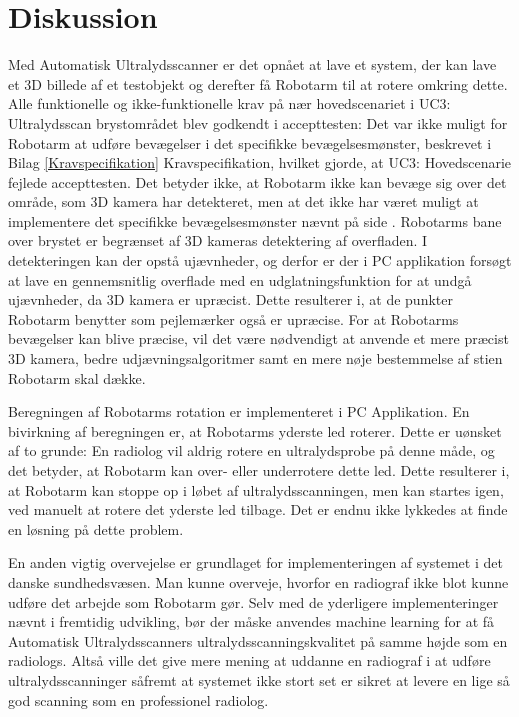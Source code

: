 \chapter{Diskussion}\label{kapitel_Diskussion}
Med Automatisk Ultralydsscanner er det opnået at lave et system, der kan lave et 3D billede af et testobjekt og derefter få Robotarm til at rotere omkring dette. Alle funktionelle og ikke-funktionelle krav på nær hovedscenariet i UC3: Ultralydsscan brystområdet blev godkendt i accepttesten: \newline
Det var ikke muligt for Robotarm at udføre bevægelser i det specifikke bevægelsesmønster, beskrevet i Bilag \ref{Kravspecifikation} Kravspecifikation, hvilket gjorde, at UC3: Hovedscenarie fejlede accepttesten. Det betyder ikke, at Robotarm ikke kan bevæge sig over det område, som 3D kamera har detekteret, men at det ikke har været muligt at implementere det specifikke bevægelsesmønster nævnt på side \pageref{Probensbevagelse}. Robotarms bane over brystet er begrænset af 3D kameras detektering af overfladen. I detekteringen kan der opstå ujævnheder, og derfor er der i PC applikation forsøgt at lave en gennemsnitlig overflade med en udglatningsfunktion for at undgå ujævnheder, da 3D kamera er upræcist. Dette resulterer i, at de punkter Robotarm benytter som pejlemærker også er upræcise. For at Robotarms bevægelser kan blive præcise, vil det være nødvendigt at anvende et mere præcist 3D kamera, bedre udjævningsalgoritmer samt en mere nøje bestemmelse af stien Robotarm skal dække.

Beregningen af Robotarms rotation er implementeret i PC Applikation. En bivirkning af beregningen er, at Robotarms yderste led roterer. Dette er uønsket af to grunde: En radiolog vil aldrig rotere en ultralydsprobe på denne måde, og det betyder, at Robotarm kan over- eller underrotere dette led. Dette resulterer i, at Robotarm kan stoppe op i løbet af ultralydsscanningen, men kan startes igen, ved manuelt at rotere det yderste led tilbage. Det er endnu ikke lykkedes at finde en løsning på dette problem.

En anden vigtig overvejelse er grundlaget for implementeringen af systemet i det danske sundhedsvæsen. Man kunne overveje, hvorfor en radiograf ikke blot kunne udføre det arbejde som Robotarm gør. Selv med de yderligere implementeringer nævnt i fremtidig udvikling, bør der måske anvendes machine learning for at få Automatisk Ultralydsscanners ultralydsscanningskvalitet på samme højde som en radiologs. Altså ville det give mere mening at uddanne en radiograf i at udføre ultralydsscanninger såfremt at systemet ikke stort set er sikret at levere en lige så god scanning som en professionel radiolog.

